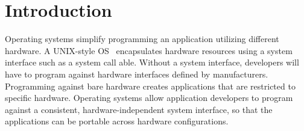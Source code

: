 \chapter{Introduction}
\label{chap:intro}

Operating systems simplify programming an application utilizing different hardware.
A UNIX-style OS~\cite{ritchie74unix}
encapsulates hardware resources using a system interface such as a system call able.
Without a system interface,
developers will have to program against hardware interfaces defined by manufacturers.
Programming against bare hardware
creates applications that are restricted to 
specific hardware.
Operating systems allow application developers to program against a consistent, hardware-independent
system interface, %
so that the applications can be portable
across hardware configurations.













